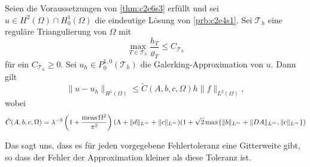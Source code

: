 \documentclass[../skript.tex]{subfiles}
\begin{document}
	
\begin{corollary}\label{cor:c2e6s3}
	Seien die Voraussetzungen von \cref{thm:c2e6s3} erfüllt und sei $u\in H^2(\Omega)\cap H^1_0(\Omega)$ die eindeutige Lösung von \cref{prb:c2e4s1}. Sei $\mathcal{T}_h$ eine reguläre Triangulierung von $\Omega$ mit 
	\[
		\max_{T\in\mathcal{T}_h} \frac{h_T}{\varrho_T} \leq C_{\mathcal{T}_h} 
	\]
	für ein $C_{\mathcal{T}_h} \geq 0$. Sei $u_h\in P^{1,0}_0(\mathcal{T}_h)$ die Galerking-Approximation von $u$. Dann gilt
	\[
		\| u-u_h\|_{H^1(\Omega)}\leq \tilde{C}(A,b,c,\Omega)h\|f\|_{L^2(\Omega)},
	\]
	wobei 
	\[
		\tilde{C}(A,b,c,\Omega) = \lambda^{-3}\left(1+\frac{\operatorname{meas}{\Omega}^2}{\pi^2}\right)(\Lambda + \|d\|_{L^\infty} + \|c\|_{L^\infty})(1+\sqrt{2}\max\{\|b\|_{L^\infty} + \|DA\|_{L^\infty},\|c\|_{L^\infty}\})
	\]
\end{corollary}
\begin{remark*}
	Das sagt uns, dass es für jeden vorgegebene Fehlertoleranz eine Gitterweite gibt, so dass der Fehler der Approximation kleiner als diese Toleranz ist.
\end{remark*}
\end{document}
